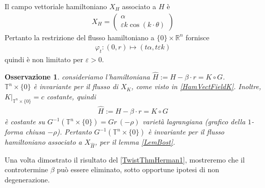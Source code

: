 \documentclass[twoside, 11pt]{amsbook}
\newcommand{\0}{{(0)}}
\newcommand{\3}{{(3)}}
\theoremstyle{colonplain}
\theoremstyle{colondefinition}
\theoremstyle{colonremark}
\newtheorem{rmk}[thm]{Osservazione}
\numberwithin{equation}{chapter}
\begin{document}
Il campo vettoriale hamiltoniano $X_H$ associato a $H$ è
\begin{align}
    X_H = \begin{pmatrix}
        \alpha \\
        \varepsilon k\cos(k \cdot \theta)
    \end{pmatrix}
\end{align}
Pertanto la restrizione del flusso hamiltoniano a $\{0\} \times \mathbb{R}^n$ fornisce
\begin{align}
    \varphi_t : (0, r) \mapsto (t\alpha, t\varepsilon k)
\end{align}
quindi è non limitato per $\varepsilon > 0$.
\begin{rmk} consideriamo l'hamiltoniana $\widehat{H} := H - \beta \cdot r = K \circ G$. \\
$\mathbb{T}^n \times \{0\}$ è invariante per il flusso di $X_K$, come visto in \eqref{HamVectFieldK}. Inoltre, $K|_{\mathbb{T}^n \times \{0\}} = c$ costante, quindi
\begin{align}
    \widehat{H} := H - \beta \cdot r = K \circ G
\end{align}
è costante su $G^{-1}(\mathbb{T}^n \times \{0\}) = Gr \, (-\rho)$ varietà lagrangiana (grafico della $1$-forma chiusa $-\rho$). Pertanto $G^{-1}(\mathbb{T}^n \times \{0\})$ è invariante per il flusso hamiltoniano associato a $X_{\widehat{H}}$, per il lemma \ref{LemBost}.
\end{rmk}
Una volta dimostrato il risultato del \cref{TwistThmHerman1}, mostreremo che il controtermine $\beta$ può essere eliminato, sotto opportune ipotesi di non degenerazione.
\end{document}
